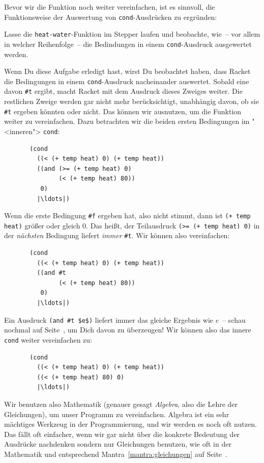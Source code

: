 Bevor wir die Funktion noch weiter vereinfachen, ist es sinnvoll, die
Funktionsweise der Auswertung von \lstinline{cond}-Ausdrücken zu ergründen:
%
\begin{aufgabeinline}
  Lasse die \lstinline{heat-water}-Funktion im Stepper laufen und
  beobachte, wie~-- vor allem in welcher Reihenfolge~-- die Bedindungen
  in einem \lstinline{cond}-Ausdruck ausgewertet werden.
\end{aufgabeinline}
%
Wenn Du diese Aufgabe erledigt hast, wirst Du beobachtet haben, dass Racket
die Bedingungen in einem \lstinline{cond}-Ausdruck nacheinander
auswertet.  Sobald eine davon \lstinline{#t} ergibt, macht Racket mit dem
Ausdruck dieses Zweiges weiter.  Die restlichen Zweige werden gar nicht
mehr berücksichtigt, unabhängig davon, ob sie \lstinline{#t} ergeben
könnten oder nicht.
Das können wir ausnutzen, um die Funktion weiter zu vereinfachen.
Dazu betrachten wir die beiden ersten Bedingungen im "<inneren">
\lstinline{cond}:
%
\begin{lstlisting}
       (cond
         ((< (+ temp heat) 0) (+ temp heat))
         ((and (>= (+ temp heat) 0)
               (< (+ temp heat) 80))
          0)
         |\ldots|)
\end{lstlisting}
%
Wenn die erste Bedingung \lstinline{#f} ergeben hat, also nicht stimmt,
dann ist \lstinline{(+ temp heat)} größer oder gleich 0.  Das heißt, der
Teilausdruck \lstinline{(>= (+ temp heat) 0)} in der \emph{nächsten}
Bedingung liefert \emph{immer} \lstinline{#t}.  Wir können also
vereinfachen:
%
\begin{lstlisting}
       (cond
         ((< (+ temp heat) 0) (+ temp heat))
         ((and #t
               (< (+ temp heat) 80))
          0)
         |\ldots|)
\end{lstlisting}
%
Ein Ausdruck \lstinline{(and #t $e$)} liefert immer das gleiche Ergebnis
wie \(e\)~-- schau nochmal auf Seite~\pageref{page:and}, um Dich davon
zu überzeugen!  Wir können also das innere \lstinline{cond} weiter
vereinfachen zu:

\begin{lstlisting}
       (cond
         ((< (+ temp heat) 0) (+ temp heat))
         ((< (+ temp heat) 80) 0)
         |\ldots|)
\end{lstlisting}
%
\label{page:bedingungen-vereinfachen}
Wir benutzen also Mathematik (genauer gesagt
\textit{Algebra}, also die Lehre der Gleichungen), um
unser Programm zu vereinfachen.  Algebra ist ein sehr mächtiges
Werkzeug in der Programmierung, und wir werden es noch oft nutzen.
Das fällt oft einfacher, wenn wir gar nicht über die konkrete
Bedeutung der Ausdrücke nachdenken sondern nur Gleichungen benutzen,
wie oft in der Mathematik und entsprechend
Mantra~\ref{mantra:gleichungen} auf Seite~\pageref{mantra:gleichungen}.

